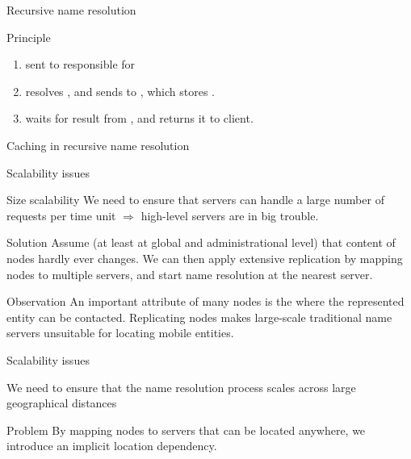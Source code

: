 \begin{slide}{Recursive name resolution}
  \vspace*{-4pt}
  \begin{block}{Principle}
    \begin{enumerate}\tightlist
    \item {} sent to  responsible for 
    \item {} resolves  \mathexpr{\rightarrow} , and sends
       to , which stores .
    \item {} waits for result from , and returns it to client.
    \end{enumerate}
    \begin{center}
    \end{center}
  \end{block}
\end{slide}
\begin{slide}{Caching in recursive name resolution}
  \begin{centerfig}
  \end{centerfig}
\end{slide}
\begin{slide}{Scalability issues}
  \begin{alertblock}{Size scalability}
    We need to ensure that servers can handle a large number of requests per time unit $\Rightarrow$
    high-level servers are in big trouble.
  \end{alertblock}
  \begin{block}{Solution} 
    Assume (at least at global and administrational level) that content of nodes hardly ever changes. 
    We can then apply extensive replication by mapping nodes to multiple servers, and start name resolution
    at the nearest server.
  \end{block}
  \begin{block}{Observation} 
    An important attribute of many nodes is the  where the represented entity can be
    contacted. Replicating nodes makes large-scale traditional name servers unsuitable for locating mobile
    entities.
  \end{block}
\end{slide}
\begin{slide}{Scalability issues}
  \begin{alertblock}{We need to ensure that the name resolution process scales across large geographical
      distances}
    \begin{center}
    \end{center}
  \end{alertblock}
  \begin{block}{Problem} 
    By mapping nodes to servers that can be located anywhere, we introduce an implicit location
    dependency.
  \end{block}
\end{slide}
